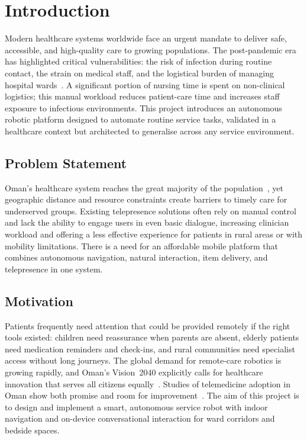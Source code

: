 \documentclass[11pt,a4paper]{article}
\begin{document}
\newpage
\tableofcontents
\newpage
\listoffigures
\listoftables
\newpage

\setcounter{page}{1}

\section{Introduction}
\label{sec:introduction}

Modern healthcare systems worldwide face an urgent mandate to deliver safe, accessible, and high-quality care to growing populations. The post-pandemic era has highlighted critical vulnerabilities: the risk of infection during routine contact, the strain on medical staff, and the logistical burden of managing hospital wards~\cite{frontiers2024}. A significant portion of nursing time is spent on non-clinical logistics; this manual workload reduces patient-care time and increases staff exposure to infectious environments. This project introduces an autonomous robotic platform designed to automate routine service tasks, validated in a healthcare context but architected to generalise across any service environment.

\subsection{Problem Statement}
Oman's healthcare system reaches the great majority of the population~\cite{alsheikhly2006}, yet geographic distance and resource constraints create barriers to timely care for underserved groups. Existing telepresence solutions often rely on manual control and lack the ability to engage users in even basic dialogue, increasing clinician workload and offering a less effective experience for patients in rural areas or with mobility limitations. There is a need for an affordable mobile platform that combines autonomous navigation, natural interaction, item delivery, and telepresence in one system.

\subsection{Motivation}
Patients frequently need attention that could be provided remotely if the right tools existed: children need reassurance when parents are absent, elderly patients need medication reminders and check-ins, and rural communities need specialist access without long journeys. The global demand for remote-care robotics is growing rapidly, and Oman's Vision~2040 explicitly calls for healthcare innovation that serves all citizens equally~\cite{alhinai2024}. Studies of telemedicine adoption in Oman show both promise and room for improvement~\cite{alsalmani2023,alshishtawy2013}. The aim of this project is to design and implement a smart, autonomous service robot with indoor navigation and on-device conversational interaction for ward corridors and bedside spaces.
\end{document}
